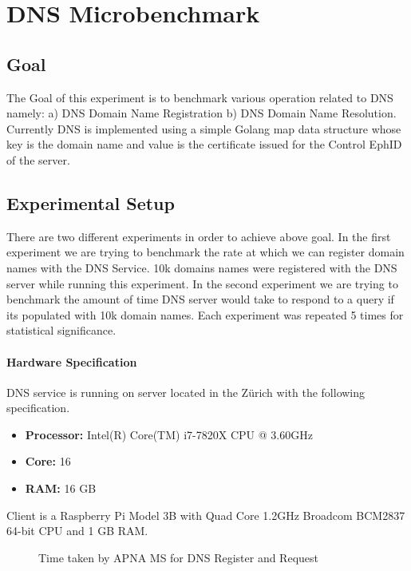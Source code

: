 \section{DNS Microbenchmark}

\subsection{Goal}
The Goal of this experiment is to benchmark various operation related to DNS namely: a) DNS Domain Name Registration b) DNS Domain Name Resolution. Currently DNS is implemented using a simple Golang map data structure whose key is the domain name and value is the certificate issued for the Control EphID of the server.

\subsection{Experimental Setup}
There are two different experiments in order to achieve above goal. In the first experiment we are trying to benchmark the rate at which we can register domain names with the DNS Service. 10k domains names were registered with the DNS server while running this experiment. In the second experiment we are trying to benchmark the amount of time DNS server would take to respond to a query if its populated with 10k domain names. Each experiment was repeated 5 times for statistical significance.
\paragraph{Hardware Specification}
DNS service is running on server located in the Z\"urich with the following specification.
\begin{itemize}
    \item \textbf{Processor:} Intel(R) Core(TM) i7-7820X CPU @ 3.60GHz
    \item \textbf{Core:} 16
    \item \textbf{RAM:} 16 GB
\end{itemize}
Client is a Raspberry Pi Model 3B with Quad Core 1.2GHz Broadcom BCM2837 64-bit CPU and 1 GB RAM.
\begin{figure}[th!!]
\centering
\noindent
{}
\decoRule
\caption[DNS Operations]{Time taken by APNA MS for DNS Register and Request}
\label{fig:perf_dns}
\end{figure}

